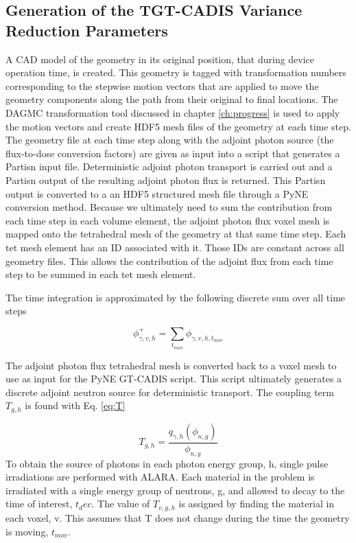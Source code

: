 \subsection{Generation of the TGT-CADIS Variance Reduction Parameters}
A CAD model of the geometry in its original position, that during device
operation time, is created.  This geometry is tagged with transformation
numbers corresponding to the stepwise motion vectors that are applied to move the
geometry components along the path from their original to final locations.  The DAGMC
transformation tool discussed in chapter \ref{ch:progress} is used to apply 
the motion vectors and create HDF5 mesh files of the geometry at each time step.   
The geometry file at each time step along with the adjoint photon source (the
flux-to-dose conversion factors) are given as input into a script that
generates a Partisn input file.  Deterministic adjoint photon transport is
carried out and a Partisn output of the resulting adjoint photon flux is
returned.  This Partisn output is converted to a an HDF5 structured mesh file
through a PyNE conversion method.  
Because we ultimately need to sum the contribution from each time step in each
volume element, the adjoint photon flux voxel mesh is mapped onto the
tetrahedral mesh of the geometry at that same time step.  Each tet
mesh element has an ID associated with it.  Those IDs are constant across all
geometry files.  This allows the contribution of the adjoint flux from each
time step to be summed in each tet mesh element.

The time integration is approximated by the following discrete sum over all
time steps

\begin{equation}\label{eq:sum}
	\phi_{\gamma,v, h}^{+} = \sum_{t_{mov}}{\phi_{\gamma,v,h,t_{mov}}}
\end{equation}

The adjoint photon flux tetrahedral mesh is converted back to a voxel mesh
to use as input for the PyNE GT-CADIS script. This script ultimately generates a
discrete adjoint neutron source for deterministic transport.
The coupling term $T_{g,h}$ is found with Eq.
\ref{eq:T}

\begin{equation}\label{eq:T}
	T_{g,h} = \dfrac{q_{\gamma, h}(\phi_{n,g})}{\phi_{n,g}}
\end{equation}
To obtain the source of photons in each photon energy group, h, 
single pulse irradiations are performed with ALARA.
Each material in the problem is irradiated with a single energy group of
neutrons, g, and allowed to decay to the time of interest, $t_dec$.  The value
of $T_{v,g,h}$ is assigned by finding the material in each voxel, v.
This assumes that T does not change during the time the geometry is
moving, $t_{mov}$.  

